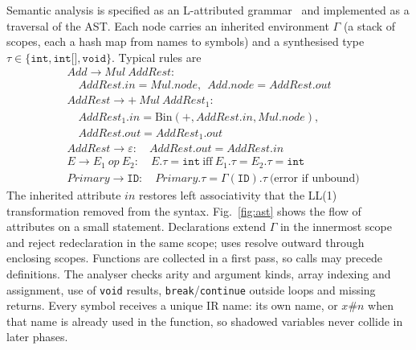 \documentclass[conference]{IEEEtran}
\newcommand{\nt}[1]{\textit{#1}}
\newcommand{\tm}[1]{\texttt{#1}}
\begin{document}
Semantic analysis is specified as an L-attributed grammar~\cite{knuth1968attr}
and implemented as a traversal of the AST. Each node carries an
inherited environment $\Gamma$ (a stack of scopes, each a hash map from
names to symbols) and a synthesised type
$\tau\in\{\tm{int},\tm{int[]},\tm{void}\}$. Typical rules are
\begin{equation}
\begin{aligned}
&\nt{Add}\to\nt{Mul}\ \nt{AddRest}:\\
&\quad \nt{AddRest}.\mathit{in}=\nt{Mul}.\mathit{node},\ \
       \nt{Add}.\mathit{node}=\nt{AddRest}.\mathit{out}\\
&\nt{AddRest}\to\tm{+}\ \nt{Mul}\ \nt{AddRest}_1:\\
&\quad \nt{AddRest}_1.\mathit{in}=\mathrm{Bin}(\tm{+},\nt{AddRest}.\mathit{in},\nt{Mul}.\mathit{node}),\\
&\quad \nt{AddRest}.\mathit{out}=\nt{AddRest}_1.\mathit{out}\\
&\nt{AddRest}\to\varepsilon:\quad \nt{AddRest}.\mathit{out}=\nt{AddRest}.\mathit{in}\\
&E\to E_1\ \mathit{op}\ E_2:\quad E.\tau=\tm{int}\ \text{iff}\ E_1.\tau=E_2.\tau=\tm{int}\\
&\nt{Primary}\to\tm{ID}:\quad \nt{Primary}.\tau=\Gamma(\tm{ID}).\tau\ \text{(error if unbound)}
\end{aligned}
\label{eq:attr}
\end{equation}
The inherited attribute $\mathit{in}$ restores left associativity that
the LL(1) transformation removed from the syntax. Fig.~\ref{fig:ast}
shows the flow of attributes on a small statement. Declarations
extend $\Gamma$ in the innermost scope and reject redeclaration in the
same scope; uses resolve outward through enclosing scopes. Functions
are collected in a first pass, so calls may precede definitions. The
analyser checks arity and argument kinds, array indexing and
assignment, use of \tm{void} results, \tm{break}/\tm{continue} outside
loops and missing returns. Every symbol receives a unique IR name: its
own name, or $x\#n$ when that name is already used in the function, so
shadowed variables never collide in later phases.
\end{document}
